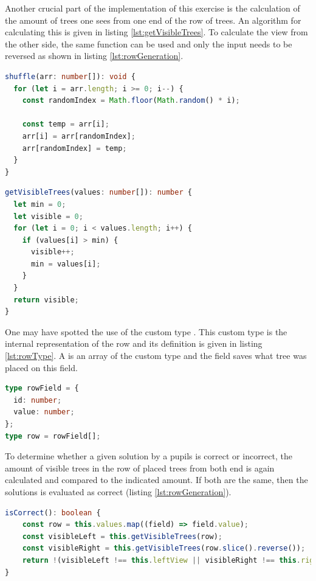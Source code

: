 Another crucial part of the implementation of this exercise is the calculation of the amount of trees one sees from one end of the row of trees. An algorithm for calculating this is given in listing \ref{lst:getVisibleTrees}. To calculate the view from the other side, the same function can be used and only the input needs to be reversed as shown in listing \ref{lst:rowGeneration}.

\begin{lstlisting}[language=TypeScript,caption={Algorithm to shuffle an array},label={lst:shuffle}]
shuffle(arr: number[]): void {
  for (let i = arr.length; i >= 0; i--) {
    const randomIndex = Math.floor(Math.random() * i);

    const temp = arr[i];
    arr[i] = arr[randomIndex];
    arr[randomIndex] = temp;
  }
}
\end{lstlisting}

\begin{lstlisting}[language=TypeScript,caption={Algorithm to calculate the amount of visible tree from one end},label={lst:getVisibleTrees}]
getVisibleTrees(values: number[]): number {
  let min = 0;
  let visible = 0;
  for (let i = 0; i < values.length; i++) {
    if (values[i] > min) {
      visible++;
      min = values[i];
    }
  }
  return visible;
}
\end{lstlisting}

One may have spotted the use of the custom type . This custom type is the internal representation of the row and its definition is given in listing \ref{lst:rowType}. A  is an array of the custom type  and the field  saves what tree was placed on this field.

\begin{lstlisting}[language=TypeScript,caption={Definition of the custom row and rowField type},label={lst:rowType}]
type rowField = {
  id: number;
  value: number;
};
type row = rowField[];
\end{lstlisting}

To determine whether a given solution by a pupils is correct or incorrect, the amount of visible trees in the row of placed trees from both end is again calculated and compared to the indicated amount. If both are the same, then the solutions is evaluated as correct (listing \ref{lst:rowGeneration}).

\begin{lstlisting}[language=TypeScript,caption={Correctness check of a row of tree exercise solution},label={lst:rowCorrectness}]
isCorrect(): boolean {
    const row = this.values.map((field) => field.value);
    const visibleLeft = this.getVisibleTrees(row);
    const visibleRight = this.getVisibleTrees(row.slice().reverse());
    return !(visibleLeft !== this.leftView || visibleRight !== this.rightView);
}
\end{lstlisting}

